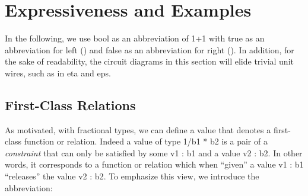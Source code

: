 \documentclass{llncs}
\newcommand{\roshan}[1]{\textsc{Roshan says:} 
  \textit{#1}
}
\begin{document}




\section{Expressiveness and Examples} 

In the following, we use {{bool}} as an abbreviation of {{1+1}} 
with {{true}} as an abbreviation for {{left ()}} and {{false}} as an 
abbreviation for {{right ()}}. In addition, for the sake of readability, the
circuit diagrams in this section will elide trivial unit wires, such as in
{{eta}} and {{eps}}.


\subsection{First-Class Relations}

As motivated, with fractional types, we can define a value that denotes a
first-class function or relation. Indeed a value of type {{1/b1 * b2}} is a
pair of a \emph{constraint} that can only be satisfied by some {{v1 : b1}}
and a value {{v2 : b2}}. In other words, it corresponds to a function or
relation which when ``given'' a value {{v1 : b1}} ``releases'' the value 
{{v2 : b2}}. To emphasize this view, we introduce the abbreviation:

\end{document}
